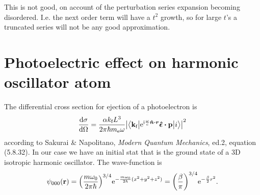 \documentclass[11pt,letter, swedish, english
]{article}
\begin{document}
This is not good, on account of the perturbation series expansion
becoming disordered. I.e. the next order term will have a $t^2$
growth, so for large $t$'s a truncated series will not be any good
approximation.\footnotemark{} 



\section{Photoelectric effect on harmonic oscillator atom}
\newcommand{\kf}{k_{\text{f}}}
\newcommand{\vkf}{\vb{k}_{\text{f}}}
\newcommand{\vq}{\vb{q}}
The differential cross section for ejection of a photoelectron is
\begin{equation}
\dv{\sigma}{\Omega}=\frac{\alpha \kf L^3}{2\pi\hbar m_\ee\omega}
\abs{\mel**{\vkf}{\ee^{\ii\frac{\omega}{c}\vu*{n}\vdot\vb*{r}}
\vu*{\epsilon}\vdot\vb{p}}{i}}^2 
\end{equation}
according to Sakurai \& Napolitano,
\textit{Modern Quantum Mechanics}, ed.2, equation (5.8.32). In our
case we have an initial stat that is the ground state of a 3D
isotropic harmonic oscillator. The wave-function is
\begin{equation}
\psi_{000}(\vb{r})=\qty(\frac{m\omega_0}{2\pi\hbar})^{3/4}
\mathrm{e}^{-\frac{m\omega_0}{2\hbar}(x^2+y^2+z^2)}
=\qty(\frac{\beta}{\pi})^{3/4}\mathrm{e}^{-\frac{\beta}{2}r^2}.
\end{equation}
\end{document}
